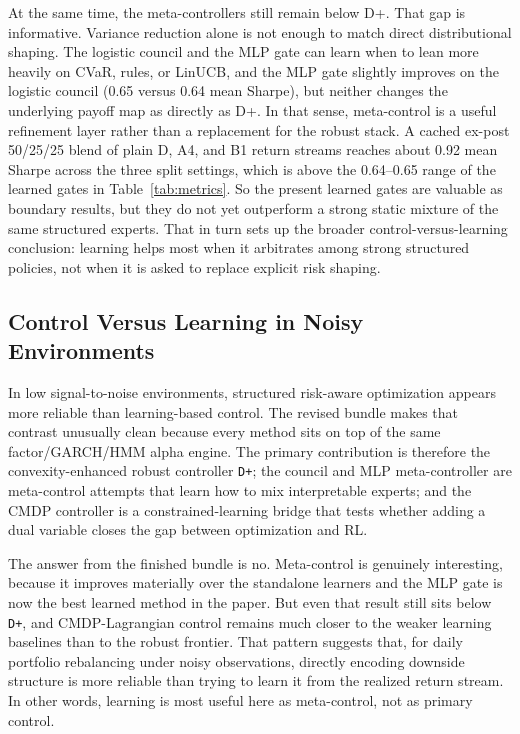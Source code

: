 \documentclass[11pt]{article}
\begin{document}
At the same time, the meta-controllers still remain below D+. That gap is
informative. Variance reduction alone is not enough to match direct
distributional shaping. The logistic council and the MLP gate can learn when to
lean more heavily on CVaR, rules, or LinUCB, and the MLP gate slightly improves
on the logistic council (0.65 versus 0.64 mean Sharpe), but neither changes the
underlying payoff map as directly as D+. In that sense, meta-control is a
useful refinement layer rather than a replacement for the robust stack. A
cached ex-post 50/25/25 blend of plain D, A4, and B1 return streams reaches
about 0.92 mean Sharpe across the three split settings, which is above the
0.64--0.65 range of the learned gates in Table~\ref{tab:metrics}. So the
present learned gates are valuable as boundary results, but they do not yet
outperform a strong static mixture of the same structured experts. That in
turn sets up the broader control-versus-learning conclusion: learning helps
most when it arbitrates among strong structured policies, not when it is asked
to replace explicit risk shaping.

\subsection{Control Versus Learning in Noisy Environments}

In low signal-to-noise environments, structured risk-aware optimization appears
more reliable than learning-based control. The revised bundle makes that
contrast unusually clean because every method sits on top of the same
factor/GARCH/HMM alpha engine. The primary contribution is therefore the
convexity-enhanced robust controller \texttt{D+}; the council and MLP
meta-controller are meta-control attempts that learn how to mix interpretable
experts; and the CMDP controller is a constrained-learning bridge that tests
whether adding a dual variable closes the gap between optimization and RL.

The answer from the finished bundle is no. Meta-control is genuinely
interesting, because it improves materially over the standalone learners and
the MLP gate is now the best learned method in the paper. But even that result
still sits below \texttt{D+}, and CMDP-Lagrangian control remains much closer
to the weaker learning baselines than to the robust frontier. That pattern
suggests that, for daily portfolio rebalancing under noisy observations,
directly encoding downside structure is more reliable than trying to learn it
from the realized return stream. In other words, learning is most useful here
as meta-control, not as primary control.
\end{document}
